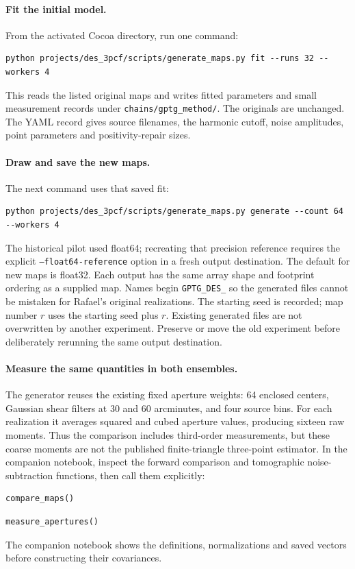 \documentclass[11pt]{article}
\begin{document}
\paragraph{Fit the initial model.}
From the activated Cocoa directory, run one command:
\begin{lstlisting}
python projects/des_3pcf/scripts/generate_maps.py fit --runs 32 --workers 4
\end{lstlisting}
This reads the listed original maps and writes fitted parameters and
small measurement records under \texttt{chains/gptg\_method/}. The originals
are unchanged. The YAML record gives source filenames, the harmonic cutoff,
noise amplitudes, point parameters and positivity-repair sizes.

\paragraph{Draw and save the new maps.}
The next command uses that saved fit:
\begin{lstlisting}
python projects/des_3pcf/scripts/generate_maps.py generate --count 64 --workers 4
\end{lstlisting}
The historical pilot used float64; recreating that precision reference
requires the explicit \texttt{--float64-reference} option in a fresh
output destination. The default for new maps is float32.
Each output has the same array shape and footprint ordering as a supplied
map. Names begin \texttt{GPTG\_DES\_} so the generated files cannot be
mistaken for Rafael's original realizations. The starting seed is recorded;
map number $r$ uses the starting seed plus $r$. Existing generated files
are not overwritten by another experiment. Preserve or move the old
experiment before deliberately rerunning the same output destination.

\paragraph{Measure the same quantities in both ensembles.}
The generator reuses the existing fixed aperture weights: 64 enclosed
centers, Gaussian shear filters at 30 and 60 arcminutes, and four source
bins. For each realization it averages squared and cubed aperture values,
producing sixteen raw moments. Thus the comparison includes third-order
measurements, but these coarse moments are not the published finite-triangle
three-point estimator. In the companion notebook, inspect the forward comparison and
tomographic noise-subtraction functions, then call them explicitly:
\begin{lstlisting}
compare_maps()
\end{lstlisting}
\begin{lstlisting}
measure_apertures()
\end{lstlisting}
The companion notebook shows the definitions,
normalizations and saved vectors before constructing their covariances.
\end{document}
